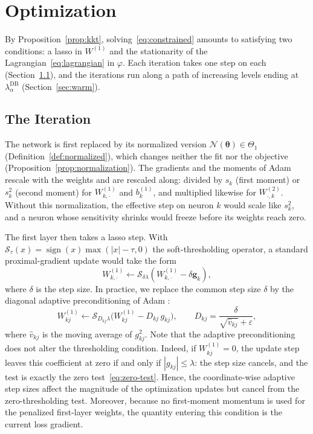 \documentclass[twoside,11pt]{article}
\newcommand{\lamDB}{\lambda_\alpha^{\mathrm{DB}}}
\newcommand{\bth}{\boldsymbol{\theta}}
\newcommand{\Wone}{W^{(1)}}
\newcommand{\soft}{\mathcal{S}}
\newcommand{\Nrm}{\mathcal{N}}
\newcommand{\Thetaone}{\Theta_{1}}
\begin{document}
\section{Optimization}\label{sec:optimization}

By Proposition~\ref{prop:kkt}, solving~\eqref{eq:constrained} amounts to satisfying two conditions: a lasso in $\Wone$ and the stationarity of the Lagrangian~\eqref{eq:lagrangian} in $\varphi$. Each iteration takes one step on each (Section~\ref{sec:iteration}), and the iterations run along a path of increasing levels ending at $\lamDB$ (Section~\ref{sec:warm}).

\subsection{The Iteration}\label{sec:iteration}
The network is first replaced by its normalized version $\Nrm(\bth)\in\Thetaone$ (Definition~\ref{def:normalized}), which changes neither the fit nor the objective (Proposition~\ref{prop:normalization}). The gradients and the moments of Adam rescale with the weights and are rescaled along: divided by $s_k$ (first moment) or $s_k^2$ (second moment) for $W^{(1)}_{k,\cdot}$ and $b^{(1)}_k$, and multiplied likewise for $W^{(2)}_{\cdot,k}$. Without this normalization, the effective step on neuron $k$ would scale like $s_k^2$, and a neuron whose sensitivity shrinks would freeze before its weights reach zero.

The first layer then takes a lasso step. With $\soft_\tau(x)=\operatorname{sign}(x)\max(|x|-\tau,0)$ the soft-thresholding operator, a standard proximal-gradient update would take the form
\begin{equation*}
    W^{(1)}_{k,\cdot}\leftarrow \soft_{\delta\lambda}
    \left(W^{(1)}_{k,\cdot} - \delta\mathbf g_k\right),
\end{equation*}
where $\delta$ is the step size. In practice, we replace the common step size $\delta$ by the diagonal adaptive preconditioning of Adam \citep{Adam,AdaProx}:
\begin{equation*}
    W^{(1)}_{kj}\leftarrow\soft_{D_{kj}\lambda}\big(W^{(1)}_{kj}-D_{kj}\,g_{kj}\big),
    \qquad
    D_{kj}=\frac{\delta}{\sqrt{\hat v_{kj}}+\varepsilon},
\end{equation*}
where $\hat v_{kj}$ is the moving average of $g_{kj}^2$. Note that the adaptive preconditioning does not alter the thresholding condition. Indeed, if $W^{(1)}_{kj}=0$, the update step leaves this coefficient at zero if and only if $|g_{kj}|\leq\lambda$: the step size cancels, and the test is exactly the zero test~\eqref{eq:zero-test}. Hence, the coordinate-wise adaptive step sizes affect the magnitude of the optimization updates but cancel from the zero-thresholding test. Moreover, because no first-moment momentum is used for the penalized first-layer weights, the quantity entering this condition is the current loss gradient. 
\end{document}
